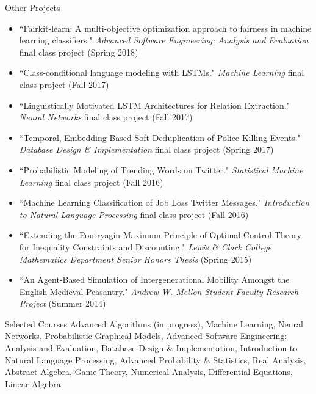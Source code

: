 \documentclass{resume} %
\begin{document}
\begin{rSection}{Other Projects}

\begin{itemize}
\item ``Fairkit-learn:  A multi-objective optimization approach to fairness in machine learning classifiers." \emph{Advanced Software Engineering: Analysis and Evaluation} final class project (Spring 2018)
\item ``Class-conditional language modeling with LSTMs." \emph{Machine Learning} final class project (Fall 2017)
\item ``Linguistically Motivated LSTM Architectures for Relation Extraction." \emph{Neural Networks} final class project (Fall 2017)  
\item ``Temporal, Embedding-Based Soft Deduplication of Police Killing Events." \emph{Database Design \& Implementation} final class project (Spring 2017) 
\item  ``Probabilistic Modeling of Trending Words on Twitter." \emph{Statistical Machine Learning} final class project (Fall 2016) 
\item ``Machine Learning Classification of Job Loss Twitter Messages." \emph{Introduction to Natural Language Processing} final class project (Fall 2016) 
\item ``Extending the Pontryagin Maximum Principle of Optimal Control Theory for Inequality Constraints and Discounting." \emph{Lewis \& Clark College Mathematics Department Senior Honors Thesis} (Spring 2015)
\item ``An Agent-Based Simulation of Intergenerational Mobility Amongst the English Medieval Peasantry." \emph{Andrew W. Mellon Student-Faculty Research Project} (Summer 2014) 
\end{itemize} 

\end{rSection}



\begin{rSection}{Selected Courses}
Advanced Algorithms (in progress), Machine Learning, Neural Networks, Probabilistic Graphical Models, Advanced Software Engineering: Analysis and Evaluation, Database Design \& Implementation, Introduction to Natural Language Processing, Advanced Probability \& Statistics, Real Analysis, Abstract Algebra, Game Theory, Numerical Analysis, Differential Equations, Linear Algebra 
\end{rSection}
\end{document}
